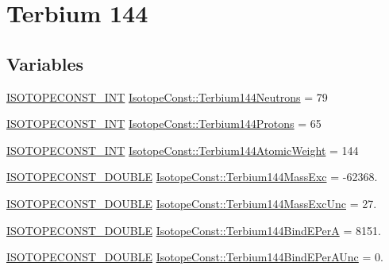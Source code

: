 \hypertarget{group___isotope_const-_terbium-_tb144}{}\section{Terbium 144}
\label{group___isotope_const-_terbium-_tb144}
\subsection*{Variables}
\begin{DoxyCompactItemize}
\item 
\mbox{\hyperlink{group___isotope_const-_macros_ga5f18360b3e99483a35c32d789e62621c}{I\+S\+O\+T\+O\+P\+E\+C\+O\+N\+S\+T\+\_\+\+I\+NT}} \mbox{\hyperlink{group___isotope_const-_terbium-_tb144_gab1ad33d24ca5d54f58623f222deeb4ca}{Isotope\+Const\+::\+Terbium144\+Neutrons}} = 79
\item 
\mbox{\hyperlink{group___isotope_const-_macros_ga5f18360b3e99483a35c32d789e62621c}{I\+S\+O\+T\+O\+P\+E\+C\+O\+N\+S\+T\+\_\+\+I\+NT}} \mbox{\hyperlink{group___isotope_const-_terbium-_tb144_ga465229d3a58118c1279a925718c5e82e}{Isotope\+Const\+::\+Terbium144\+Protons}} = 65
\item 
\mbox{\hyperlink{group___isotope_const-_macros_ga5f18360b3e99483a35c32d789e62621c}{I\+S\+O\+T\+O\+P\+E\+C\+O\+N\+S\+T\+\_\+\+I\+NT}} \mbox{\hyperlink{group___isotope_const-_terbium-_tb144_ga58a6018170435ff9b2c1963434d299ce}{Isotope\+Const\+::\+Terbium144\+Atomic\+Weight}} = 144
\item 
\mbox{\hyperlink{group___isotope_const-_macros_ga8f45a7272ce02c0b4c65c44636ed719a}{I\+S\+O\+T\+O\+P\+E\+C\+O\+N\+S\+T\+\_\+\+D\+O\+U\+B\+LE}} \mbox{\hyperlink{group___isotope_const-_terbium-_tb144_gab5dff5faa9065b7192ab4870395cb566}{Isotope\+Const\+::\+Terbium144\+Mass\+Exc}} = -\/62368.
\item 
\mbox{\hyperlink{group___isotope_const-_macros_ga8f45a7272ce02c0b4c65c44636ed719a}{I\+S\+O\+T\+O\+P\+E\+C\+O\+N\+S\+T\+\_\+\+D\+O\+U\+B\+LE}} \mbox{\hyperlink{group___isotope_const-_terbium-_tb144_ga764e725c2a7c30553aa75b1d88a6da64}{Isotope\+Const\+::\+Terbium144\+Mass\+Exc\+Unc}} = 27.
\item 
\mbox{\hyperlink{group___isotope_const-_macros_ga8f45a7272ce02c0b4c65c44636ed719a}{I\+S\+O\+T\+O\+P\+E\+C\+O\+N\+S\+T\+\_\+\+D\+O\+U\+B\+LE}} \mbox{\hyperlink{group___isotope_const-_terbium-_tb144_gac8726eed8c88b16cac4795674589cb8a}{Isotope\+Const\+::\+Terbium144\+Bind\+E\+PerA}} = 8151.
\item 
\mbox{\hyperlink{group___isotope_const-_macros_ga8f45a7272ce02c0b4c65c44636ed719a}{I\+S\+O\+T\+O\+P\+E\+C\+O\+N\+S\+T\+\_\+\+D\+O\+U\+B\+LE}} \mbox{\hyperlink{group___isotope_const-_terbium-_tb144_ga50803ba721ef541e388730c63a6a4fbc}{Isotope\+Const\+::\+Terbium144\+Bind\+E\+Per\+A\+Unc}} = 0.

\end{DoxyCompactItemize}
